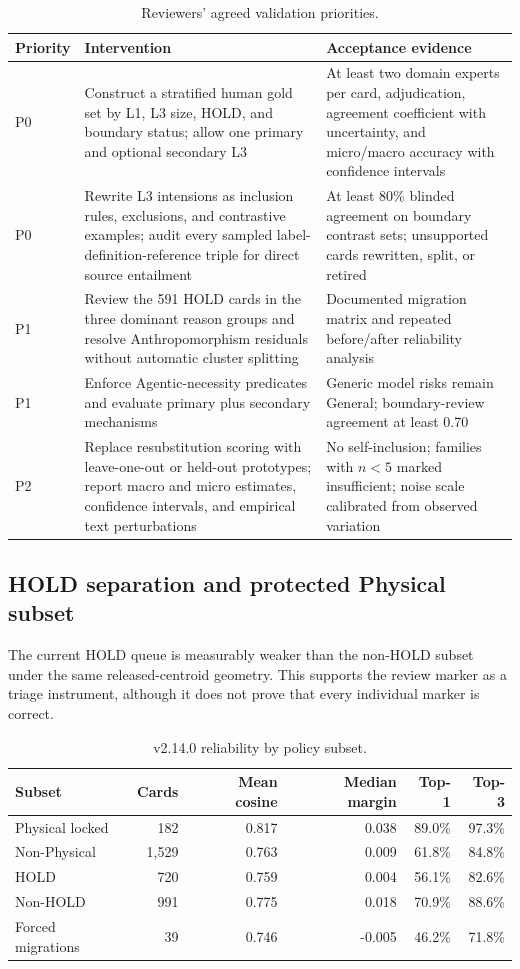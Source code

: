 \documentclass[11pt,a4paper]{article}
\begin{document}
\begin{table}[H]
\centering
\caption{Reviewers' agreed validation priorities.}
\small
\begin{tabularx}{\textwidth}{p{1.0cm} X X}
\toprule
Priority & Intervention & Acceptance evidence \\
\midrule
P0 & Construct a stratified human gold set by L1, L3 size, HOLD, and boundary
status; allow one primary and optional secondary L3 & At least two domain
experts per card, adjudication, agreement coefficient with uncertainty, and
micro/macro accuracy with confidence intervals \\
P0 & Rewrite L3 intensions as inclusion rules, exclusions, and contrastive
examples; audit every sampled label-definition-reference triple for direct
source entailment & At least 80\% blinded agreement on boundary contrast sets;
unsupported cards rewritten, split, or retired \\
P1 & Review the 591 HOLD cards in the three dominant reason groups and resolve
Anthropomorphism residuals without automatic cluster splitting & Documented
migration matrix and repeated before/after reliability analysis \\
P1 & Enforce Agentic-necessity predicates and evaluate primary plus secondary
mechanisms & Generic model risks remain General; boundary-review agreement at
least 0.70 \\
P2 & Replace resubstitution scoring with leave-one-out or held-out prototypes;
report macro and micro estimates, confidence intervals, and empirical text
perturbations & No self-inclusion; families with $n<5$ marked insufficient;
noise scale calibrated from observed variation \\
\bottomrule
\end{tabularx}
\end{table}

\subsection{HOLD separation and protected Physical subset}

The current HOLD queue is measurably weaker than the non-HOLD subset under the
same released-centroid geometry. This supports the review marker as a triage
instrument, although it does not prove that every individual marker is correct.

\begin{table}[H]
\centering
\caption{v2.14.0 reliability by policy subset.}
\small
\begin{tabular}{lrrrrr}
\toprule
Subset & Cards & Mean cosine & Median margin & Top-1 & Top-3 \\
\midrule
Physical locked & 182 & 0.817 & 0.038 & 89.0\% & 97.3\% \\
Non-Physical & 1,529 & 0.763 & 0.009 & 61.8\% & 84.8\% \\
HOLD & 720 & 0.759 & 0.004 & 56.1\% & 82.6\% \\
Non-HOLD & 991 & 0.775 & 0.018 & 70.9\% & 88.6\% \\
Forced migrations & 39 & 0.746 & -0.005 & 46.2\% & 71.8\% \\
\bottomrule
\end{tabular}
\end{table}
\end{document}

